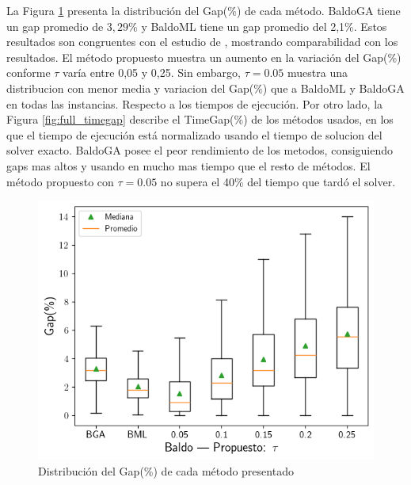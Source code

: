 \documentclass[spanish, a4paper, 12pt, openany,final]{book}
\begin{document}
La Figura \ref{fig:full_gap} presenta la distribución del Gap(\%) de cada método.
 BaldoGA tiene un gap promedio de $3,29\%$ y BaldoML tiene un gap promedio del 2,1\%. Estos resultados son congruentes con el estudio de \cite{baldo_polynomial_2023}, mostrando comparabilidad con los resultados. El método propuesto muestra un aumento en la variación del Gap(\%) conforme $\tau$ varía entre 0,05 y 0,25. Sin embargo, $\tau=0.05$ muestra una distribucion con menor media y variacion del Gap(\%) que a BaldoML y BaldoGA en todas las instancias. Respecto a los tiempos de ejecución. Por otro lado, la Figura \ref{fig:full_timegap} describe el TimeGap(\%) de los métodos usados, en los que el tiempo de ejecución está normalizado usando el tiempo de solucion del solver exacto. BaldoGA posee el peor rendimiento de los metodos, consiguiendo gaps mas altos y usando en mucho mas tiempo que el resto de métodos. El método propuesto con $\tau = 0.05$ no supera el 40\% del tiempo que tardó el solver.


\begin{figure}[H]
	\centering
	\includegraphics[scale=0.7]{graphs/full_gap_comparison.png}
	\caption{Distribución del Gap(\%) de cada método presentado}
	\label{fig:full_gap}
\end{figure}
\end{document}
